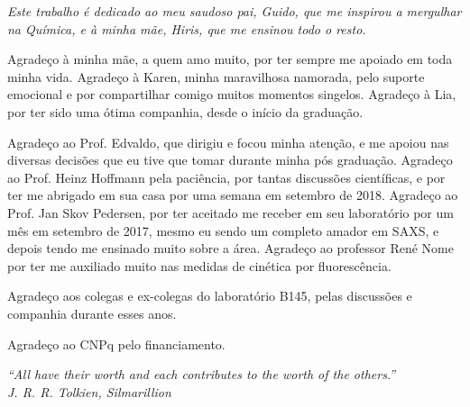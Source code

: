 \documentclass[
	12pt,				%
	openright,			%
	twoside,			%
	a4paper,			%
	english,			%
	brazil%
	]{abntex2}
\begin{document}
\begin{dedicatoria}
   \vspace*{\fill}
   \centering
   \noindent
   \textit{
   	Este trabalho é dedicado ao meu saudoso pai, Guido, que me inspirou a mergulhar na Química, e à minha mãe, Hiris, que me ensinou todo o resto.   
} \vspace*{\fill}
\end{dedicatoria}

\begin{agradecimentos}

Agradeço à minha mãe, a quem amo muito, por ter sempre me apoiado em toda minha vida. Agradeço à Karen, minha maravilhosa namorada, pelo suporte emocional e por compartilhar comigo muitos momentos singelos. Agradeço à Lia, por ter sido uma ótima companhia, desde o início da graduação.

Agradeço ao Prof. Edvaldo, que dirigiu e focou minha atenção, e me apoiou nas diversas decisões que eu tive que tomar durante minha pós graduação. Agradeço ao Prof. Heinz Hoffmann pela paciência, por tantas discussões científicas, e por ter me abrigado em sua casa por uma semana em setembro de 2018. Agradeço ao Prof. Jan Skov Pedersen, por ter aceitado me receber em seu laboratório por um mês em setembro de 2017, mesmo eu sendo um completo amador em SAXS, e depois tendo me ensinado muito sobre a área. Agradeço ao professor René Nome por ter me auxiliado muito nas medidas de cinética por fluorescência.

Agradeço aos colegas e ex-colegas do laboratório B145, pelas discussões e companhia durante esses anos.

Agradeço ao CNPq pelo financiamento.

\end{agradecimentos}

\begin{epigrafe}
    \vspace*{\fill}
	\begin{flushright}
		\textit{``All have their worth and each contributes to the worth of the others.'' \\ J. R. R. Tolkien, Silmarillion}
	\end{flushright}
\end{epigrafe}

\end{document}
